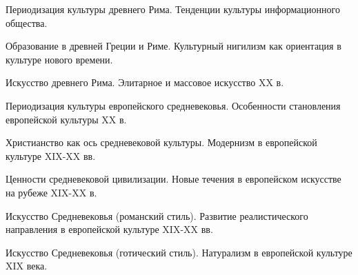 \newpage


\shapkFull
\setcounter{zad}{0}

\z Периодизация культуры древнего Рима.
 \medskip
\z Тенденции культуры информационного общества.
 \medskip

\newpage


\shapkFull
\setcounter{zad}{0}

\z Образование в древней Греции и Риме.
 \medskip
\z Культурный нигилизм как ориентация в культуре нового времени.
 \medskip

\newpage


\shapkFull
\setcounter{zad}{0}

\z Искусство древнего Рима.
 \medskip
\z Элитарное и массовое искусство XX в.
 \medskip

\newpage


\shapkFull
\setcounter{zad}{0}

\z Периодизация культуры европейского средневековья.
 \medskip
\z Особенности становления европейской культуры XX в.
 \medskip

\newpage


\shapkFull
\setcounter{zad}{0}

\z Христианство как ось средневековой культуры.
 \medskip
\z Модернизм в европейской культуре XIX-XX вв.
 \medskip

\newpage


\shapkFull
\setcounter{zad}{0}

\z Ценности средневековой цивилизации.
 \medskip
\z Новые течения в европейском искусстве на рубеже XIX-XX в.
 \medskip

\newpage


\shapkFull
\setcounter{zad}{0}

\z Искусство Средневековья (романский стиль).
 \medskip
\z Развитие реалистического направления в европейской культуре XIX-XX вв.
 \medskip

\newpage


\shapkFull
\setcounter{zad}{0}

\z Искусство Средневековья (готический стиль).
 \medskip
\z Натурализм в европейской культуре XIX века.
 \medskip

